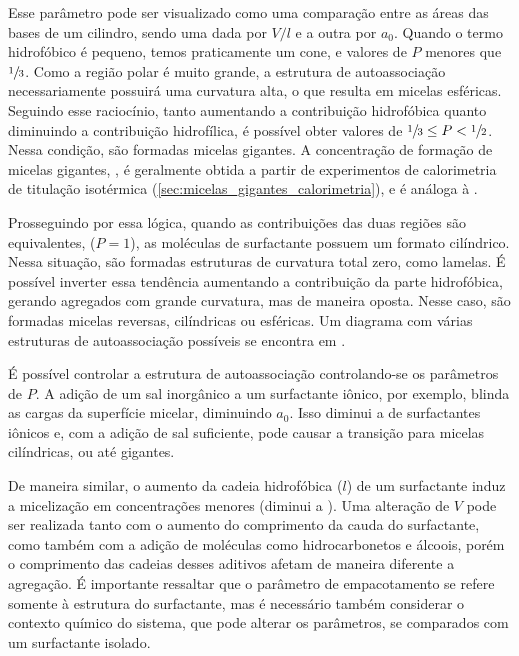 	Esse parâmetro pode ser visualizado como uma comparação entre as áreas das bases de um cilindro, sendo uma dada por \({V}/{l}\) e a outra por \(a_0\). Quando o termo hidrofóbico é pequeno, temos praticamente um cone, e valores de \(P\) menores que \(\sfrac{1}{3}\). Como a região polar é muito grande, a estrutura de autoassociação necessariamente possuirá uma curvatura alta, o que resulta em micelas esféricas. Seguindo esse raciocínio, tanto aumentando a contribuição hidrofóbica quanto diminuindo a contribuição hidrofílica, é possível obter valores de \(\sfrac{1}{3} \leq P < \sfrac{1}{2}\). Nessa condição, são formadas micelas gigantes. A concentração de formação de micelas gigantes, \cwlm, é geralmente obtida a partir de experimentos de calorimetria de titulação isotérmica (\autoref{sec:micelas_gigantes_calorimetria}), e é análoga à \cmc.
	
	Prosseguindo por essa lógica, quando as contribuições das duas regiões são equivalentes, (\(P = 1\)), as moléculas de surfactante possuem um formato cilíndrico. Nessa situação, são formadas estruturas de curvatura total zero, como lamelas.\cite{Zou2007} É possível inverter essa tendência aumentando a contribuição da parte hidrofóbica, gerando agregados com grande curvatura, mas de maneira oposta. Nesse caso, são formadas micelas reversas, cilíndricas\cite{Tung2006} ou esféricas\cite{Mackeben2001a}.  Um diagrama com várias estruturas de autoassociação possíveis se encontra em \citeauthor{Lindman_livro}.

	É possível controlar a estrutura de autoassociação controlando-se os parâmetros de \(P\). A adição de um sal inorgânico a um surfactante iônico, por exemplo, blinda as cargas da superfície micelar, diminuindo \(a_0\). Isso diminui a \cmc{} de surfactantes iônicos\cite{Sarac2009} e, com a adição de sal suficiente, pode causar a transição para micelas cilíndricas,\cite{Garamus2003a} ou até gigantes.\cite{Helgeson2010d} 
	
	De maneira similar, o aumento da cadeia hidrofóbica (\(l\)) de um surfactante induz a micelização em concentrações menores (diminui a \cmc).\cite{Bai2008, Sarac2017a} Uma alteração de \(V\) pode ser realizada tanto com o aumento do comprimento da cauda do surfactante, como também com a adição de moléculas como hidrocarbonetos e álcoois, porém o comprimento das cadeias desses aditivos afetam de maneira diferente a agregação.\cite{Bayer1986, Bielawska2013a, Kamada2014a} É importante ressaltar que o parâmetro de empacotamento se refere somente à estrutura do surfactante, mas é necessário também considerar o contexto químico do sistema, que pode alterar os parâmetros, se comparados com um surfactante isolado. 
	

